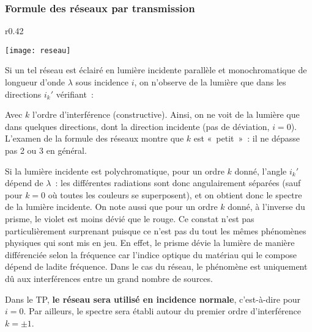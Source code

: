 \documentclass[a4paper, 12pt, final, garamond]{book}
\begin{document}
\subsubsection{Formule des réseaux par transmission}

\begin{wrapfigure}{r}{0.42\textwidth} 
\vspace{-40pt}

  \begin{center}
      \texttt{[image: reseau]}
  \end{center}

  \vspace{-40pt}
\end{wrapfigure} 


Si un tel réseau est éclairé en lumière incidente
parallèle et monochromatique de longueur d'onde $\lambda$ sous incidence
$i$, on n'observe de la lumière que dans les directions $i_{k}'$ vérifiant~:
 
 
Avec $k$ l'ordre d'interférence (constructive). Ainsi, on ne voit de la lumière
que dans quelques directions, dont la direction incidente (pas de déviation,
$i=0$). L'examen de la formule des réseaux montre que $k$ est «~petit~»~: il ne
dépasse pas 2 ou 3 en général.

\medskip

Si la lumière incidente est polychromatique, pour un ordre $k$ donné, l'angle
$i_{k}'$ dépend de $\lambda$~: les différentes radiations sont donc
angulairement séparées (sauf pour $k = 0$ où toutes les couleurs se
superposent), et on obtient donc le spectre de la lumière incidente. On note
aussi que pour un ordre $k$ donné, à l'inverse du prisme, le violet est moins
dévié que le rouge. Ce constat n'est pas particulièrement surprenant puisque ce
n'est pas du tout les mêmes phénomènes physiques qui sont mis en jeu. En effet,
le prisme dévie la lumière de manière différenciée selon la fréquence car
l'indice optique du matériau qui le compose dépend de ladite fréquence. Dans le
cas du réseau, le phénomène est uniquement dû aux interférences entre un grand
nombre de sources. 

\medskip

Dans le TP, \textbf{le réseau sera utilisé en incidence normale}, c'est-à-dire
pour $i = 0$. Par ailleurs, le spectre sera établi autour du premier ordre
d'interférence $k = \pm 1$. 
\end{document}
